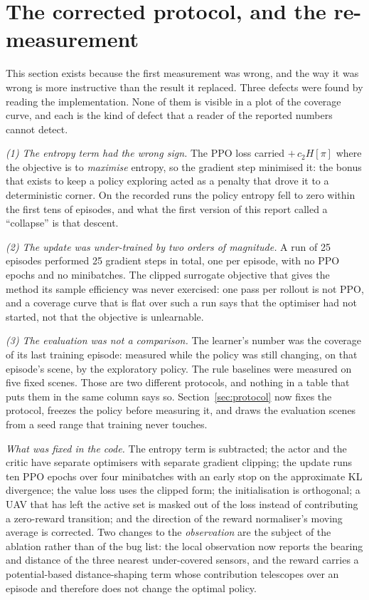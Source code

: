 \documentclass[conference]{IEEEtran}
\begin{document}
\section{The corrected protocol, and the re-measurement}
\label{sec:second_sprint}

This section exists because the first measurement was wrong, and the way it was wrong
is more instructive than the result it replaced.
Three defects were found by reading the implementation.  None of them is
visible in a plot of the coverage curve, and each is the kind of defect that a
reader of the reported numbers cannot detect.

\emph{(1) The entropy term had the wrong sign.}  The PPO loss carried
$+\,c_2 H[\pi]$ where the objective is to \emph{maximise} entropy, so the
gradient step minimised it: the bonus that exists to keep a policy exploring
acted as a penalty that drove it to a deterministic corner.  On the recorded
runs the policy entropy fell to zero within the first tens of episodes, and
what the first version of this report called a ``collapse'' is that descent.

\emph{(2) The update was under-trained by two orders of magnitude.}  A run of
25 episodes performed 25 gradient steps in total, one per episode, with no
PPO epochs and no minibatches.  The clipped surrogate objective that gives the
method its sample efficiency was never exercised: one pass per rollout is not
PPO, and a coverage curve that is flat over such a run says that the optimiser
had not started, not that the objective is unlearnable.

\emph{(3) The evaluation was not a comparison.}  The learner's number was the
coverage of its last training episode: measured while the policy was still
changing, on that episode's scene, by the exploratory policy.  The rule
baselines were measured on five fixed scenes.  Those are two different
protocols, and nothing in a table that puts them in the same column says so.
Section~\ref{sec:protocol} now fixes the protocol, freezes the policy before
measuring it, and draws the evaluation scenes from a seed range that training
never touches.

\emph{What was fixed in the code.}  The entropy term is subtracted; the actor
and the critic have separate optimisers with separate gradient clipping; the
update runs ten PPO epochs over four minibatches with an early stop on the
approximate KL divergence; the value loss uses the clipped form; the
initialisation is orthogonal; a UAV that has left the active set is masked out
of the loss instead of contributing a zero-reward transition; and the
direction of the reward normaliser's moving average is corrected.  Two changes
to the \emph{observation} are the subject of the ablation rather than of the
bug list: the local observation now reports the bearing and distance of the
three nearest under-covered sensors, and the reward carries a potential-based
distance-shaping term whose contribution telescopes over an episode and
therefore does not change the optimal policy.
\end{document}

